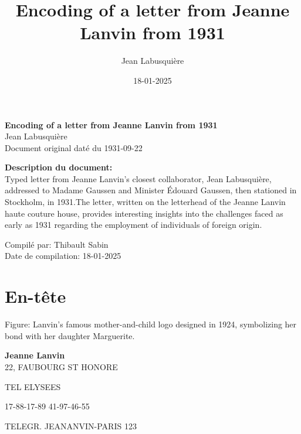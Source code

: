 \documentclass[12pt,a4paper]{article}
\title{Encoding of a letter from Jeanne Lanvin from 1931}
\author{Jean Labusquière}
\date{18-01-2025}
\begin{document}
\begin{titlepage}
\centering
\vspace*{1cm}
{\huge\bfseries Encoding of a letter from Jeanne Lanvin from 1931\\}
\vspace{1.5cm}
{\Large Jean Labusquière\\}
\vspace{0.5cm}
{\large Document original daté du 1931-09-22\\}
\vspace{1cm}
\begin{minipage}{0.9\textwidth}
\begin{center}
\large\textbf{Description du document:}\\
\vspace{0.3cm}
\normalsize Typed letter from Jeanne Lanvin's closest collaborator, Jean Labusquière, addressed to Madame Gaussen and Minister Édouard Gaussen, then stationed in Stockholm, in 1931.The letter, written on the letterhead of the Jeanne Lanvin haute couture house, provides interesting insights into the challenges faced as early as 1931 regarding the employment of individuals of foreign origin.
\end{center}
\end{minipage}
\vfill
{\large Compilé par: Thibault Sabin\\}
{\large Date de compilation: 18-01-2025\\}
\vfill
\end{titlepage}

\tableofcontents

\newpage

\section{En-tête}
Figure: Lanvin's famous mother-and-child logo designed in 1924, symbolizing her bond with her daughter Marguerite.


\begin{center}
\textbf{\large Jeanne Lanvin}
\\22, FAUBOURG ST HONORE

               
                  TEL ELYSEES
               
               17-88-17-89
               41-97-46-55
            
TELEGR. JEANANVIN-PARIS 123
\end{center}
\end{document}
